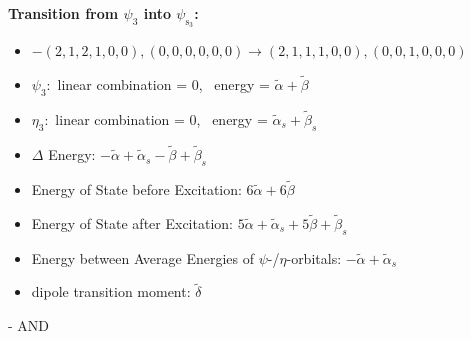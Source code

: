 \documentclass[12pt,a4paper]{article}
\begin{document}
        \noindent\textbf{Transition from $\psi_{3}$ into $\psi_{\text{s}_{3}}$:}
        \begin{itemize}
            \item $- (2, 1, 2, 1, 0, 0), (0, 0, 0, 0, 0, 0) \rightarrow (2, 1, 1, 1, 0, 0), (0, 0, 1, 0, 0, 0)$
        
            \item $\psi_{3}:$ linear combination = $0$, \
            energy = $\tilde{\alpha} + \tilde{\beta}$
            
            \item $\eta_{3}:$ linear combination = $0$, \
            energy = $\tilde{\alpha}_{s} + \tilde{\beta}_{s}$
            
                \item $\Delta$ Energy: $- \tilde{\alpha} + \tilde{\alpha}_{s} - \tilde{\beta} + \tilde{\beta}_{s}$
                \item Energy of State before Excitation: $6 \tilde{\alpha} + 6 \tilde{\beta}$
                \item Energy of State after Excitation: $5 \tilde{\alpha} + \tilde{\alpha}_{s} + 5 \tilde{\beta} + \tilde{\beta}_{s}$
                \item Energy between Average Energies of $\psi$-/$\eta$-orbitals: $- \tilde{\alpha} + \tilde{\alpha}_{s}$
            
            \item dipole transition moment: $\tilde{\delta}$
        
        \end{itemize}
        
 -  AND 
\end{document}
